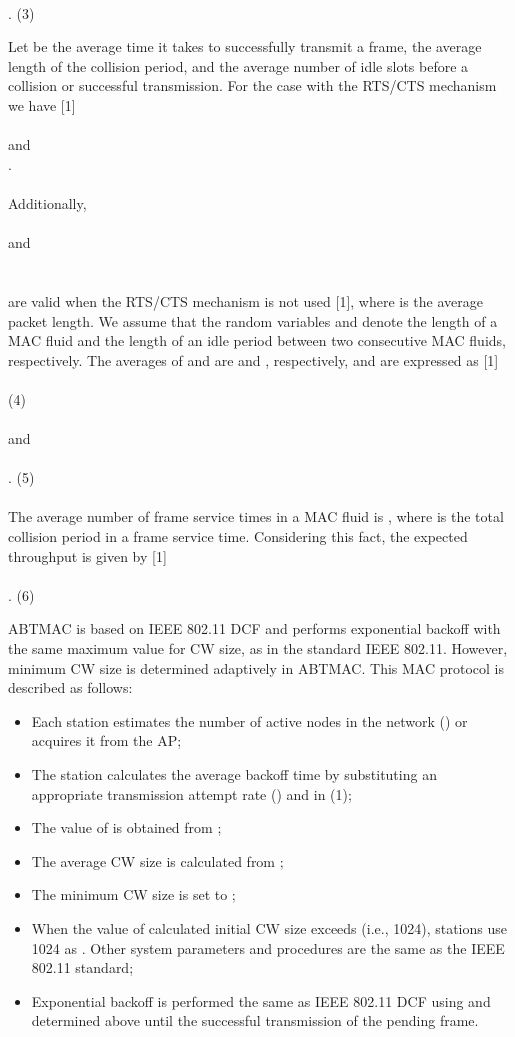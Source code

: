 \documentclass[10pt,twocolumn,oneside,submit]{JCNtran}
\begin{document}
\\
. \hfill(3) \\
\par Let  be the average time it takes to successfully transmit a frame,  the average length of the collision period, and  the average number of idle slots before a collision or successful transmission. For the case with the RTS/CTS mechanism we have [1]\\
\\
 and\\
.\\
\\
Additionally,\\
\\
 and\\
\\
\\
are valid when the RTS/CTS mechanism is not used [1], where  is the average packet length. We assume that the random variables  and  denote the length of a MAC fluid and the length of an idle period between two consecutive MAC fluids, respectively. The averages of  and  are  and , respectively, and are expressed as [1]\\
\\
 \hfill(4) \\
\\
and\\
\\
. \hfill(5) \\
\\
The average number of frame service times in a MAC fluid is , where  is the total collision period in a frame service time. Considering this fact, the expected throughput is given by [1]\\
\\
. \hfill(6) \\
\par ABTMAC is based on IEEE 802.11 DCF and performs exponential backoff with the same maximum value for CW size, as in the standard IEEE 802.11. However, minimum CW size is determined adaptively in ABTMAC. This MAC protocol is described as follows:\\
\begin{itemize}
\item
Each station estimates the number of active nodes in the network () or acquires it from the AP;
\item
The station calculates the average backoff time  by substituting an appropriate transmission attempt rate () and  in (1);
\item
The value of  is obtained from ;
\item
The average CW size is calculated from ;
\item
The minimum CW size is set to ;
\item
When the value of calculated initial CW size exceeds  (i.e., 1024), stations use 1024 as . Other system parameters and procedures are the same as the IEEE 802.11 standard;
\item
Exponential backoff is performed the same as IEEE 802.11 DCF using  and  determined above until the successful transmission of the pending frame.\\
\end{itemize}
\end{document}
